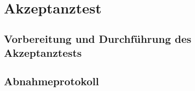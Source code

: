 \section{Akzeptanztest}
\subsection{Vorbereitung und Durchführung des Akzeptanztests}
\subsection{Abnahmeprotokoll}
